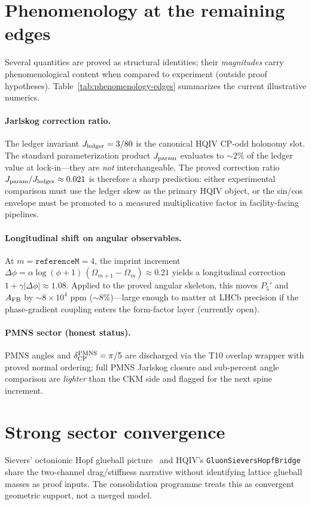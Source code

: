\documentclass[11pt]{amsart}
\begin{document}
\section{Phenomenology at the remaining edges}
Several quantities are proved as structural identities; their \emph{magnitudes} carry
phenomenological content when compared to experiment (outside proof hypotheses).
Table~\ref{tab:phenomenology-edges} summarizes the current illustrative numerics.


\paragraph{Jarlskog correction ratio.}
The ledger invariant $J_{\rm ledger}=3/80$ is the canonical HQIV CP-odd holonomy slot.
The standard parameterization product $J_{\rm param}$ evaluates to $\sim 2\%$ of the ledger
value at lock-in---they are \emph{not} interchangeable.
The proved correction ratio $J_{\rm param}/J_{\rm ledger}\approx 0.021$ is therefore a
sharp prediction: either experimental comparison must use the ledger skew as the primary
HQIV object, or the sin/cos envelope must be promoted to a measured multiplicative factor
in facility-facing pipelines.

\paragraph{Longitudinal shift on angular observables.}
At $m=\texttt{referenceM}=4$, the imprint increment
$\Delta\phi=\alpha\log(\phi+1)\,(\Omega_{m+1}-\Omega_m)\approx 0.21$ yields a longitudinal
correction $1+\gamma|\Delta\phi|\approx 1.08$.
Applied to the proved angular skeleton, this moves $P_5'$ and $A_{\rm FB}$ by $\sim 8\times 10^4$ ppm
($\sim 8\%$)---large enough to matter at LHCb precision if the phase-gradient coupling
enters the form-factor layer (currently open).

\paragraph{PMNS sector (honest status).}
PMNS angles and $\delta_{\rm CP}^{\rm PMNS}=\pi/5$ are discharged via the T10 overlap wrapper
with proved normal ordering; full PMNS Jarlskog closure and sub-percent angle comparison
are \emph{lighter} than the CKM side and flagged for the next spine increment.

\section{Strong sector convergence}
Sievers' octonionic Hopf glueball picture~\cite{Sievers2026Glueball} and HQIV's
\texttt{GluonSieversHopfBridge} share the two-channel drag/stiffness narrative without
identifying lattice glueball masses as proof inputs.
The consolidation programme treats this as convergent geometric support, not a merged model.
\end{document}

